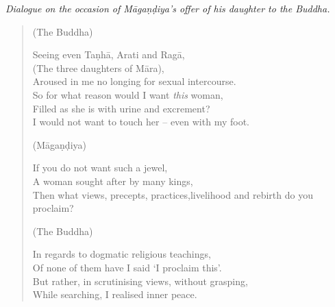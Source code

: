 
\noindent\textit{\small Dialogue on the occasion of M\=aga\d{n}\d{d}iya's offer of his daughter to the Buddha.}

\begin{verse}

(The Buddha)

 Seeing even Taṇhā, Arati and Ragā,\\
(The three daughters of Māra),\\
Aroused in me no longing for sexual intercourse.\\
So for what reason would I want \emph{this} woman,\\
Filled as she is with urine and excrement?\\
I would not want to touch her -- even with my foot.


(M\=aga\d{n}\d{d}iya)

 If you do not want such a jewel,\\
A woman sought after by many kings,\\
Then what views, precepts, practices,\newline livelihood and rebirth do you proclaim?


(The Buddha)

 In regards to dogmatic religious teachings,\\
Of none of them have I said `I proclaim this'.\\
But rather, in scrutinising views, without grasping,\\
While searching, I realised inner peace.


\end{verse}
